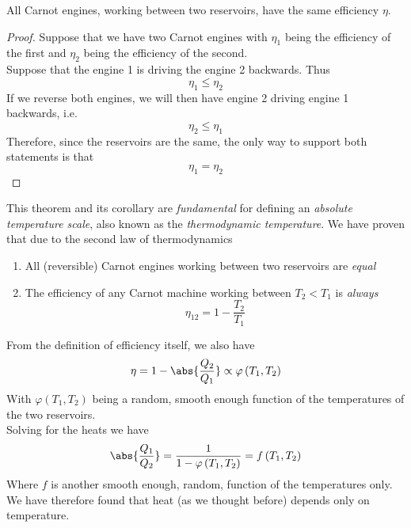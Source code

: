 \documentclass[../qm.tex]{subfiles}
\begin{document}
\begin{cor}
	All Carnot engines, working between two reservoirs, have the same efficiency $\eta$.
\end{cor}
\begin{proof}
	Suppose that we have two Carnot engines with $\eta_1$ being the efficiency of the first and $\eta_2$ being the efficiency of the second.\\
	Suppose that the engine 1 is driving the engine 2 backwards. Thus
	\begin{equation*}
		\eta_1\le\eta_2
	\end{equation*}
	If we reverse both engines, we will then have engine 2 driving engine 1 backwards, i.e.
	\begin{equation*}
		\eta_2\le\eta_1
	\end{equation*}
	Therefore, since the reservoirs are the same, the only way to support both statements is that
	\begin{equation}
		\eta_1=\eta_2
	\end{equation}
\end{proof}
This theorem and its corollary are \textit{fundamental} for defining an \textit{absolute temperature scale}, also known as the \textit{thermodynamic temperature}. We have proven that due to the second law of thermodynamics
\begin{enumerate}
\item All (reversible) Carnot engines working between two reservoirs are \textit{equal}
\item The efficiency of any Carnot machine working between $T_2<T_1$ is \textit{always}
	\begin{equation*}
		\eta_{12}=1-\frac{T_2}{T_1}
	\end{equation*}
\end{enumerate}
From the definition of efficiency itself, we also have
\begin{equation*}
	\eta=1-\abs{\frac{Q_2}{Q_1}}\propto\varphi\left( T_1, T_2 \right)
\end{equation*}
With $\varphi(T_1, T_2)$ being a random, smooth enough function of the temperatures of the two reservoirs.\\
Solving for the heats we have
\begin{equation*}
	\abs{\frac{Q_1}{Q_2}}=\frac{1}{1-\varphi\left( T_1, T_2 \right)}=f\left( T_1, T_2 \right)
\end{equation*}
Where $f$ is another smooth enough, random, function of the temperatures only. We have therefore found that heat (as we thought before) depends only on temperature.\\
\end{document}
